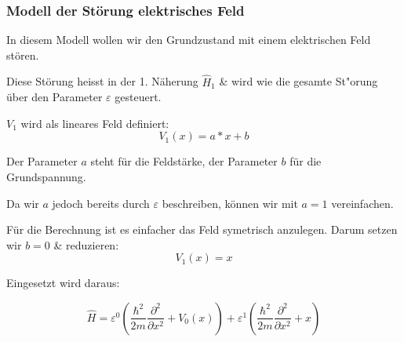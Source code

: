 \begin{refsection}
\subsubsection{Modell der St\"orung elektrisches Feld}

In diesem Modell wollen wir den Grundzustand mit einem elektrischen Feld st\"oren.

Diese St\"orung heisst in der 1. N\"aherung $\hat H_1$ \& wird wie die gesamte St"orung \"uber den 
Parameter $\varepsilon$ gesteuert.

$V_1$ wird als lineares Feld definiert:
\begin{equation}
  V_1(x) = a*x + b
\end{equation}

Der Parameter $a$ steht f\"ur die Feldst\"arke, der Parameter $b$ f\"ur die Grundspannung.

Da wir $a$ jedoch bereits durch $\varepsilon$ beschreiben, k\"onnen wir mit $a = 1$ vereinfachen.

F\"ur die Berechnung ist es einfacher das Feld symetrisch anzulegen. Darum setzen wir $b = 0$ \& reduzieren:
\[
  V_1(x) = x
\]

Eingesetzt wird daraus:

\[
  \hat{H} = \varepsilon^0 ( \frac{\hbar^2}{2m} \frac{\partial^2}{\partial x^2} + V_0(x) )
            + \varepsilon^1 ( \frac{\hbar^2}{2m} \frac{\partial^2}{\partial x^2} + x )
\]



\end{refsection}
